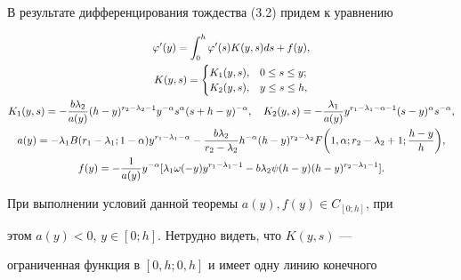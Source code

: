 В результате дифференцирования тождества (3.2) придем к уравнению 


\begin{gather} 


\varphi'(y)=\int^h_0 \varphi'(s)K(y,s)d s+f(y),\\ 


% 


K(y,s)= 


\begin{cases} 


K_1(y,s), & 0\le s\le y; \\ 


K_2(y,s), & y\le s\le h, 


\end{cases} 


\notag \\ 


% 


K_1(y,s)=-\frac{b\lambda_2}{a(y)}(h-y)^{r_2-\lambda_2-1} 


y^{-\alpha}s^\alpha(s+h-y)^{-\alpha},\quad 


K_2(y,s)=-\frac{\lambda_1}{a(y)}y^{r_1-\lambda_1-\alpha-1} 


(s-y)^\alpha s^{-\alpha},\notag \\ 


% 


a(y)=-\lambda_1B(r_1-\lambda_1;1-\alpha)y^{r_1-\lambda_1-\alpha} 


-\frac{b\lambda_2}{r_2-\lambda_2}h^{-\alpha} 


(h-y)^{r_2-\lambda_2}F\bigg(1,\alpha;r_2-\lambda_2+1; 


\frac{h-y}{h}\bigg),\notag \\ 


% 


f(y)=-\frac{1}{a(y)}y^{-\alpha}[\lambda_1\omega(-y) 


y^{r_1-\lambda_1-1}-b\lambda_2\psi(h-y) 


(h-y)^{r_2-\lambda_1-1}].\notag 


\end{gather} 


 


При выполнении условий данной теоремы $a(y),f(y)\in C_{[0;h]}$, при 


этом $a(y)<0$, $y\in[0;h]$. Нетрудно видеть, что $K(y,s)$ --- 


ограниченная функция в $[0,h;0,h]$ и имеет одну линию конечного 


